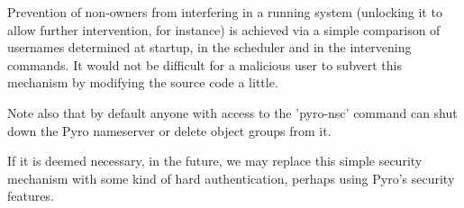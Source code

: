 
Prevention of non-owners from interfering in a running system (unlocking
it to allow further intervention, for instance) is achieved via a simple
comparison of usernames determined at startup, in the scheduler and in
the intervening commands. It would not be difficult for a malicious user
to subvert this mechanism by modifying the source code a little. 

Note also that by default anyone with access to the 'pyro-nsc' command
can shut down the Pyro nameserver or delete object groups from it. 

If it is deemed necessary, in the future, we may replace this simple
security mechanism with some kind of hard authentication, perhaps using
Pyro's security features.
